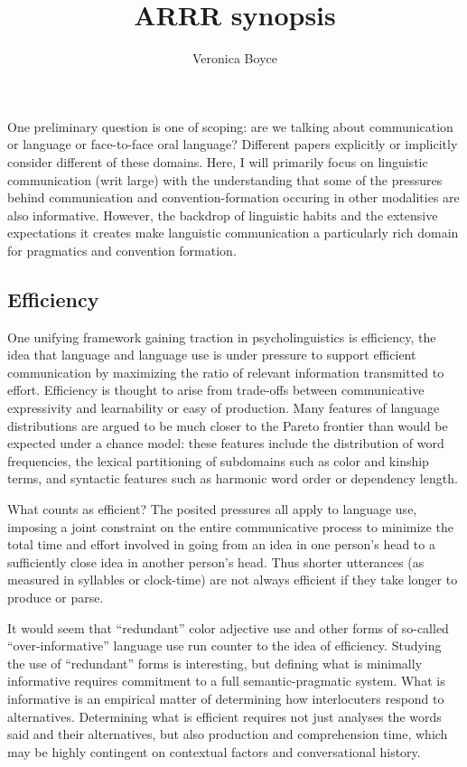 \documentclass[]{article}
\title{ARRR synopsis}
\author{Veronica Boyce}
\begin{document}
	
	\maketitle
	

One preliminary question is one of scoping: are we talking about communication or language or face-to-face oral language? Different papers explicitly or implicitly consider different of these domains. Here, I will primarily focus on linguistic communication (writ large) with the understanding that some of the pressures behind communication and convention-formation occuring in other modalities are also informative. However, the backdrop of linguistic habits and the extensive expectations it creates make languistic communication a particularly rich domain for pragmatics and convention formation. 

\subsection{Efficiency}
One unifying framework gaining traction in psycholinguistics is efficiency, the idea that language and language use is under pressure to support efficient communication by maximizing the ratio of relevant information transmitted to effort. Efficiency is thought to arise from trade-offs between communicative expressivity and learnability or easy of production. Many features of language distributions are argued to be much closer to the Pareto frontier than would be expected under a chance model: these features include the distribution of word frequencies, the lexical partitioning of subdomains such as color and kinship terms, and syntactic features such as harmonic word order or dependency length. 

What counts as efficient? The posited pressures all apply to language use, imposing a joint constraint on the entire communicative process to minimize the total time and effort involved in going from an idea in one person's head to a sufficiently close idea in another person's head. Thus shorter utterances (as measured in syllables or clock-time) are not always efficient if they take longer to produce or parse. 

It would seem that ``redundant'' color adjective use and other forms of so-called ``over-informative'' language use run counter to the idea of efficiency. Studying the use of ``redundant'' forms is interesting, but defining what is minimally informative requires commitment to a full semantic-pragmatic system. What is informative is an empirical matter of determining how interlocuters respond to alternatives. Determining what is efficient requires not just analyses the words said and their alternatives, but also production and comprehension time, which may be highly contingent on contextual factors and conversational history. 
\end{document}
